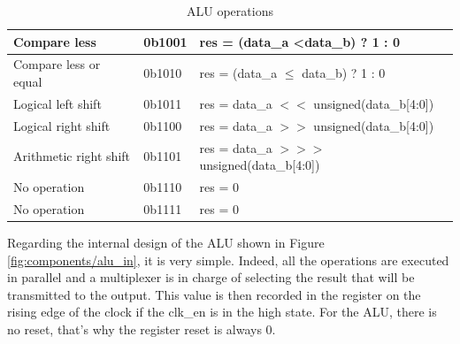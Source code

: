 \begin{table}[ht]
\begin{tabular}{|l|l|l|}
    Compare less                                                     & 0b1001                                                      & res = (data\_a \textless data\_b) ? 1 : 0                      \\ \hline
    Compare less or equal                                            & 0b1010                                                      & res = (data\_a $\leq$ data\_b) ? 1 : 0                   \\ \hline
    Logical left shift                                               & 0b1011                                                      & res = data\_a $<<$ unsigned(data\_b[4:0])                     \\ \hline
    Logical right shift                                              & 0b1100                                                      & res = data\_a $>>$ unsigned(data\_b[4:0])               \\ \hline
    Arithmetic right shift                                           & 0b1101                                                      & res = data\_a $>>>$ unsigned(data\_b[4:0]) \\ \hline
    No operation                                                     & 0b1110                                                      & res = 0                                                        \\ \hline
    No operation                                                     & 0b1111                                                      & res = 0                                                        \\ \hline
    \end{tabular}
    \caption{ALU operations}
    \label{tab:alu/alufn}
\end{table}

Regarding the internal design of the ALU shown in Figure \ref{fig:components/alu_in}, it is very 
simple. Indeed, all the operations are executed in parallel and a multiplexer is in charge of 
selecting the result that will be transmitted to the output. This value is then recorded in the 
register on the rising edge of the clock if the clk\_en is in the high state. For the ALU, there is 
no reset, that's why the register reset is always 0.

